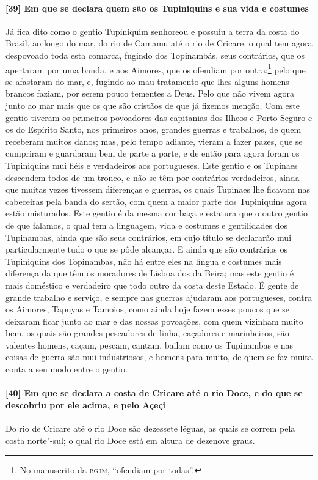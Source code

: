 \paragraph{[39] Em que se declara quem são os Tupiniquins e sua vida e costumes} \quad
Já fica dito como o gentio Tupiniquim senhoreou e possuiu a terra da costa do Brasil, ao
longo do mar, do rio de Camamu até o rio de Cricare, o qual tem agora despovoado toda esta
comarca, fugindo dos Topinambás, seus contrários, que os apertaram por uma banda, e aos
Aimores, que os ofendiam por outra;\footnote{ No manuscrito da \textsc{bgjm}, ``ofendiam
por todas''.} pelo que se afastaram do mar, e, fugindo ao mau tratamento que lhes alguns
homens brancos faziam, por serem pouco tementes a Deus. Pelo que não vivem agora junto ao
mar mais que os que são cristãos de que já fizemos menção. Com este gentio tiveram os
primeiros povoadores das capitanias dos Ilheos e Porto Seguro e os do Espírito Santo, nos
primeiros anos, grandes guerras e trabalhos, de quem receberam muitos danos; mas, pelo
tempo adiante, vieram a fazer pazes, que se cumpriram e guardaram bem de parte a parte, e
de então para agora foram os Tupiniquins mui fiéis e verdadeiros aos portugueses. Este
gentio e os Tupinaes descendem todos de um tronco, e não se têm por contrários
verdadeiros, ainda que muitas vezes tivessem diferenças e guerras, os quais Tupinaes lhe
ficavam nas cabeceiras pela banda do sertão, com quem a maior parte dos Tupiniquins agora
estão misturados. Este gentio é da mesma cor baça e estatura que o outro gentio de que
falamos, o qual tem a linguagem, vida e costumes e gentilidades dos Tupinambas, ainda que
são seus contrários, em cujo título se declararão mui particularmente tudo o que se pôde
alcançar. E ainda que são contrários os Tupiniquins dos Topinambas, não há entre eles na
língua e costumes mais diferença da que têm os moradores de Lisboa dos da Beira; mas este
gentio é mais doméstico e verdadeiro que todo outro da costa deste Estado. É gente de
grande trabalho e serviço, e sempre nas guerras ajudaram aos portugueses, contra os
Aimores, Tapuyas e Tamoios, como ainda hoje fazem esses poucos que se deixaram ficar junto
ao mar e das nossas povoações, com quem vizinham muito bem, os quais são grandes
pescadores de linha, caçadores e marinheiros, são valentes homens, caçam, pescam, cantam,
bailam como os Tupinambas e nas coisas de guerra são mui industriosos, e homens para
muito, de quem se faz muita conta a seu modo entre o gentio.

\paragraph{[40] Em que se declara a costa de Cricare até o rio Doce, e do que se descobriu
por ele acima, e pelo Açeçi} \quad
Do rio de Cricare até o rio Doce são dezessete léguas, as quais se correm pela costa
norte"-sul; o qual rio Doce está em altura de dezenove graus.

